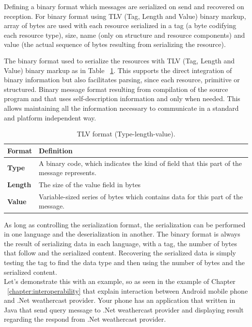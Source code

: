 Defining a binary format which messages are serialized on send and recovered on reception. For binary format using TLV (Tag, Length and Value) binary markup\citep{asn1:opt}, array of bytes are used with each resource serialized in a tag (a byte codifying each resource type), size, name (only on structure and resource components) and value (the actual sequence of bytes resulting from serializing the resource).

The binary format used to serialize the resources with TLV (Tag, Length and Value) binary markup as in Table ~\ref{tab:tvl}. This supports the direct integration of binary information but also facilitates parsing, since each resource, primitive or structured. Binary message format resulting from compilation of the source program and that uses self-description information and only when needed. This allows maintaining all the information necessary to communicate in a standard and platform independent way.

\begin{table}
\centering
\begin{tabular}{ p{5.50cm} p{5.50cm} }
\toprule
\multicolumn{1}{l}{\textbf{Format}} & \textbf{Definition}\\
\midrule
\textbf{Type}  &  A binary code, which indicates the kind of field that this part of the message represents.\\
\textbf{Length} & The size of the value field in bytes \\
\textbf{Value} & Variable-sized series of bytes which contains data for this part of the message.\\

\bottomrule
\end{tabular}
\caption[TLV format (Type-length-value).]{TLV format (Type-length-value).}
\label{tab:tvl}
\end{table}


As long as controlling the serialization format, the serialization can be performed in one language and the deserialization in another. The binary format is always the result of serializing data in each language, with a tag, the number of bytes that follow and the serialized content. Recovering the serialized data is simply testing the tag to find the data type and then using the number of bytes and the serialized content.\\

Let’s demonstrate this with an example, so as seen in the example of Chapter ~\ref{chapter:interoperability} that explain interaction between Android mobile phone and .Net weathercast provider. Your phone has an application that written in Java that send query message to .Net weathercast provider and displaying result regarding the respond from .Net weathercast provider.\\


